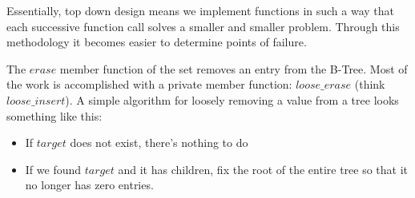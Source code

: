 Essentially, top down design means we implement functions in such a way that each successive function call solves a smaller and smaller problem. Through this methodology it becomes easier to determine points of failure.

The $erase$ member function of the set removes an entry from the B-Tree. Most of the work is accomplished with a private member function: $loose\_erase$ (think $loose\_insert$). A simple algorithm for loosely removing a value from a tree looks something like this:
\begin{itemize}
\item If $target$ does not exist, there's nothing to do
\item If we found $target$ and it has children, fix the root of the entire tree so that it no longer has zero entries.
\end{itemize}

